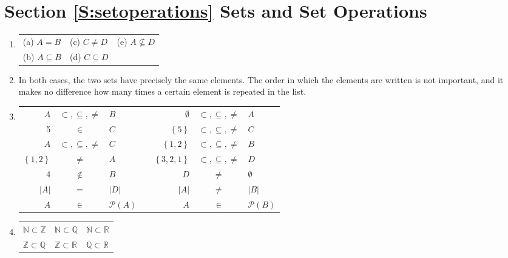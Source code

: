 \section*{Section \ref{S:setoperations} Sets and Set Operations}

\begin{enumerate}
\item \begin{tabular}[t]{p{1.2in} p{1.2in} p{1.2in}}
(a) $A = B$  &  (c) $C \ne D$  &  (e) $A \not \subseteq D$ \\
(b) $A \subseteq B$  &  (d) $C \subseteq D$ &  \\
\end{tabular}


\item In both cases, the two sets have precisely the same elements.  The order in which the elements are written is not important, and it makes no difference how many times a certain element is repeated in the list.


\item \begin{tabular}[t]{r c l c r c l }
$A$ & $\subset, \subseteq , \ne$ & $B$ &  &  $\emptyset$ & $\subset , \subseteq , \ne$ & $A$  \\
5   & $\in$ & $C$ & & $\left\{ 5 \right\}$ & $\subset , \subseteq , \ne$ & $C$ \\
$A$ & $\subset, \subseteq , \ne$ & $C$ &  &  $\left\{ 1,2 \right\}$ & $\subset, \subseteq , \ne$ & $B$ \\
$\left\{ 1,2 \right\}$ & $\ne$ & $A$ &  &  $\left\{ 3,2,1 \right\}$ & $\subset, \subseteq , \ne$ & $D$ \\
4  &  $\notin$ &  $B$ &  &  $D$ &  $\ne$ &  $\emptyset$ \\
$\left| A \right|$ &  $=$ & $\left| D \right|$ & & $\left| A \right|$ & $\ne$ & $\left| B \right|$ \\
$A$ & $\in$ &  $\mathcal{P} \left( A \right)$ & & $A$ & $\in$ &  $\mathcal{P} \left( B \right)$ \\
\end{tabular}


\item \begin{tabular}[t]{l l l}
$\mathbb{N} \subset \mathbb{Z}$  &  $\mathbb{N} \subset \mathbb{Q}$ & 
$\mathbb{N} \subset \mathbb{R}$   \\
$\mathbb{Z} \subset \mathbb{Q}$  &  $\mathbb{Z} \subset \mathbb{R}$   & $\mathbb{Q} \subset \mathbb{R}$ \\
\end{tabular}



\end{enumerate}
